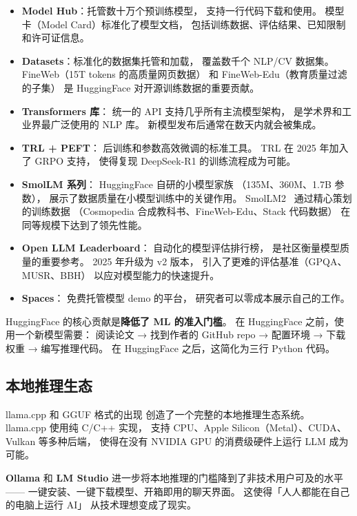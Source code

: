 \begin{itemize}[noitemsep]
  \item \textbf{Model Hub}：托管数十万个预训练模型，
        支持一行代码下载和使用。
        模型卡（Model Card）标准化了模型文档，
        包括训练数据、评估结果、已知限制和许可证信息。
  \item \textbf{Datasets}：标准化的数据集托管和加载，
        覆盖数千个 NLP/CV 数据集。
        FineWeb（15T tokens 的高质量网页数据）
        和 FineWeb-Edu（教育质量过滤的子集）
        是 HuggingFace 对开源训练数据的重要贡献。
  \item \textbf{Transformers 库}：
        统一的 API 支持几乎所有主流模型架构，
        是学术界和工业界最广泛使用的 NLP 库。
        新模型发布后通常在数天内就会被集成。
  \item \textbf{TRL + PEFT}：
        后训练和参数高效微调的标准工具。
        TRL 在 2025 年加入了 GRPO 支持，
        使得复现 DeepSeek-R1 的训练流程成为可能。
  \item \textbf{SmolLM 系列}：
        HuggingFace 自研的小模型家族
        （135M、360M、1.7B 参数），
        展示了数据质量在小模型训练中的关键作用。
        SmolLM2~\cite{allal2025smollm2} 通过精心策划的训练数据
        （Cosmopedia 合成教科书、FineWeb-Edu、Stack 代码数据）
        在同等规模下达到了领先性能。
  \item \textbf{Open LLM Leaderboard}：
        自动化的模型评估排行榜，
        是社区衡量模型质量的重要参考。
        2025 年升级为 v2 版本，
        引入了更难的评估基准（GPQA、MUSR、BBH）
        以应对模型能力的快速提升。
  \item \textbf{Spaces}：
        免费托管模型 demo 的平台，
        研究者可以零成本展示自己的工作。
\end{itemize}

HuggingFace 的核心贡献是\textbf{降低了 ML 的准入门槛}。
在 HuggingFace 之前，使用一个新模型需要：
阅读论文 → 找到作者的 GitHub repo → 配置环境 → 下载权重
→ 编写推理代码。
在 HuggingFace 之后，这简化为三行 Python 代码。

\subsection{本地推理生态}

llama.cpp 和 GGUF 格式的出现
创造了一个完整的本地推理生态系统。
llama.cpp 使用纯 C/C++ 实现，
支持 CPU、Apple Silicon（Metal）、CUDA、Vulkan 等多种后端，
使得在没有 NVIDIA GPU 的消费级硬件上运行 LLM 成为可能。

\textbf{Ollama} 和 \textbf{LM Studio}
进一步将本地推理的门槛降到了非技术用户可及的水平——
一键安装、一键下载模型、开箱即用的聊天界面。
这使得「人人都能在自己的电脑上运行 AI」
从技术理想变成了现实。

